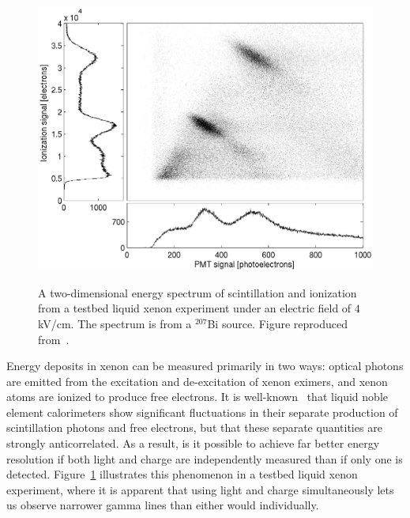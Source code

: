 \begin{figure}
\begin{center}
\includegraphics[keepaspectratio=true,width=\textwidth]{4kV_correl1.eps}
\end{center}
\renewcommand{\baselinestretch}{1}
\small\normalsize
\begin{quote}
\caption{A two-dimensional energy spectrum of scintillation and ionization from a testbed liquid xenon experiment under an electric field of $4$ kV/cm.  The spectrum is from a $^{207}$Bi source.  Figure reproduced from~\cite{PhysRevB.68.054201}.}
\label{fig:AnticorrelationInXenon}
\end{quote}
\end{figure}
\renewcommand{\baselinestretch}{2}
\small\normalsize

Energy deposits in xenon can be measured primarily in two ways: optical photons are emitted from the excitation and de-excitation of xenon eximers, and xenon atoms are ionized to produce free electrons.  It is well-known~\cite{PhysRevB.68.054201} that liquid noble element calorimeters show significant fluctuations in their separate production of scintillation photons and free electrons, but that these separate quantities are strongly anticorrelated.  As a result, is it possible to achieve far better energy resolution if both light and charge are independently measured than if only one is detected. Figure~\ref{fig:AnticorrelationInXenon} illustrates this phenomenon in a testbed liquid xenon experiment, where it is apparent that using light and charge simultaneously lets us observe narrower gamma lines than either would individually.

